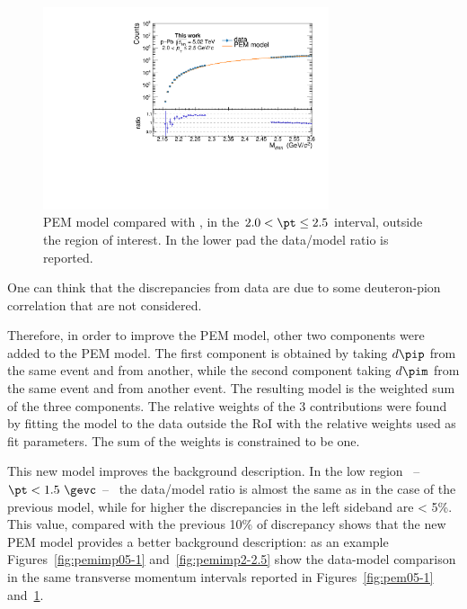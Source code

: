 \begin{figure} [htb]
    \centering
    \includegraphics[width=0.75\textwidth]{gfx/appendix/pem/can_blindPEM4}
	\caption{PEM model compared with \minv, in the $2.0 < \pt \leq 2.5$ \gevc interval, outside the region of interest. In the lower pad the data/model ratio is reported.}
	\label{fig:pem2-2.5}
\end{figure}

One can think that the discrepancies from data are due to some deuteron-pion correlation
that are not considered.

Therefore, in order to improve the PEM model, other two components were added to the PEM model. 
The first component is obtained by taking $d\pip$ from the same event and \pim from another, while the 
second component taking $d\pim$ from the same event and \pip from another event.
The resulting model is the weighted sum of the three components.
The relative weights of the 3 contributions were found by fitting the model to the data outside the RoI
with the relative weights used as fit parameters. The sum of the weights is constrained to be one.

This new model improves the background description.
In the low \pt region \ -- $\pt < 1.5\ \gevc$ -- \ the data/model ratio is almost the same as in the case
of the previous model, while for higher \pt the discrepancies in the left sideband are < 5\%.
This value, compared with the previous 10\% of discrepancy shows that the new PEM
model provides a better background description: as an example 
Figures~\ref{fig:pemimp05-1} and~\ref{fig:pemimp2-2.5} show the data-model comparison in the same 
transverse momentum intervals reported in Figures~\ref{fig:pem05-1} and~\ref{fig:pem2-2.5}.


